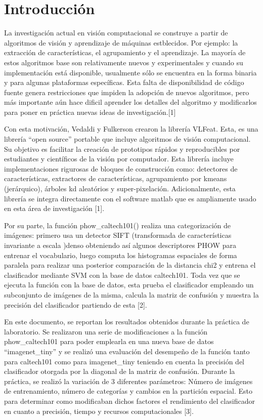 \documentclass[10pt,twocolumn,letterpaper]{article}
\begin{document}
\section{Introducción}

La investigación actual en visión computacional se construye a partir de algoritmos de visión y aprendizaje de máquinas estblecidos. Por ejemplo: la extracción de características, el agrupamiento y el aprendizaje. La mayoría de estos algoritmos base son relativamente nuevos y experimentales y cuando su implementación está disponible, usualmente sólo se encuentra en la forma binaria y para algunas plataformas específicas. Esta falta de disponibilidad de código fuente genera restricciones que impiden la adopción de nuevos algoritmos, pero más importante aún hace dificil aprender los detalles del algoritmo y modificarlos para poner en práctica nuevas ideas de investigación.[1]

Con esta motivación, Vedaldi y Fulkerson crearon la librería VLFeat. Esta, es una librería “open source” portable que incluye algoritmos de visión computacional. Su objetivo es facilitar la creación de prototipos rápidos y reproducibles por estudiantes y científicos de la visión por computador. Esta librería incluye implementaciones rigurosas de bloques de construcción como: detectores de características, extractores de características, agrupamiento por kmeans (jerárquico), árboles kd aleatórios y super-pixelación. Adicionalmente, esta librería se integra directamente con el software matlab que es ampliamente usado en esta área de investigación [1].

Por su parte, la función phow\_caltech101() realiza una categorización de imágenes: primero usa un detector SIFT (transformada de características invariante a escala )denso obteniendo así algunos descriptores PHOW para entrenar el vocabulario, luego computa los histogramas espaciales de forma paralela para realizar una posterior comparación de la distancia chi2 y  entrena el clasificador mediante SVM con la base de datos caltech101. Toda vez que se ejecuta la función con la base de datos, esta prueba el clasificador empleando un subconjunto de imágenes de la misma, calcula la matriz de confusión y muestra la precisión del clasificador partiendo de esta [2].

En este documento, se reportan los resultados obtenidos durante la práctica de laboratorio. Se realizaron una serie de modificaciones a la función phow\_caltech101 para poder emplearla en una nueva base de datos “imagenet\_tiny” y se realizó una evaluación del desempeño de la función tanto para caltech101 como para imagenet\_tiny teniendo en cuenta la precisión del clasificador otorgada por la diagonal de la matriz de confusión. Durante la práctica, se realizó la variación de 3 diferentes parámetros: Número de imágenes de entrenamiento, número de categorías y cambios en la partición espacial. Esto para determinar como modificaban dichos factores el rendimiento del clasificador en cuanto a precisión, tiempo y recursos computacionales [3].
\end{document}
